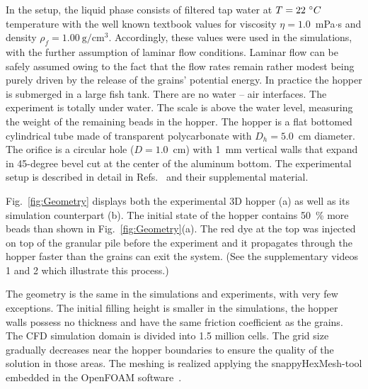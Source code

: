 \documentclass[twoside,twocolumn,9pt]{article}
\begin{document}

In the setup, the liquid phase consists of filtered tap water at $T=22~\degree C$ temperature with the well known textbook values 
for viscosity $\eta = 1.0$~mPa$\cdot$s and density $\rho_f=1.00~\mathrm{g/cm^3}$. Accordingly, these values were used in the 
simulations, with the further assumption of laminar flow conditions. 
Laminar flow can be safely assumed owing to the fact 
that the flow rates remain rather modest being purely 
driven by the release of the grains' potential energy.
In practice the hopper is submerged in a large fish tank. There are 
no water -- air interfaces. The experiment is totally under water. 
The scale is above the water level, measuring the weight of 
the remaining beads in the hopper. 
The hopper is a flat 
bottomed cylindrical tube made of transparent polycarbonate with $D_h = 5.0$~cm diameter. 
The orifice is a circular hole ($D=1.0$~cm) with 1~mm vertical walls that expand in 45-degree bevel cut at the center of the aluminum bottom. 
The experimental setup is described in detail in Refs.~\cite{koivistoSubmitted,koivisto2017PRE} and their supplemental material.




Fig.~\ref{fig:Geometry} displays both the experimental 3D hopper (a) as well as its simulation counterpart (b). The initial state of the hopper contains 50~\% more beads than shown in Fig.~\ref{fig:Geometry}(a). The red dye at the top was injected on top of the granular pile before the experiment and it propagates through the hopper faster than the grains can exit the system. (See the supplementary videos 1 and 2 which illustrate this process.)

The geometry is the same in the simulations and experiments, with very few exceptions. The initial filling height is smaller in the simulations, 
the hopper walls possess no thickness and have the same friction coefficient as the grains. The CFD simulation domain is divided into 1.5 million cells. The grid size gradually decreases near the hopper boundaries to ensure the quality of the solution in those areas. The meshing is realized applying the snappyHexMesh-tool embedded in the OpenFOAM software~\cite{openfoamdoc}.
%
\end{document}
